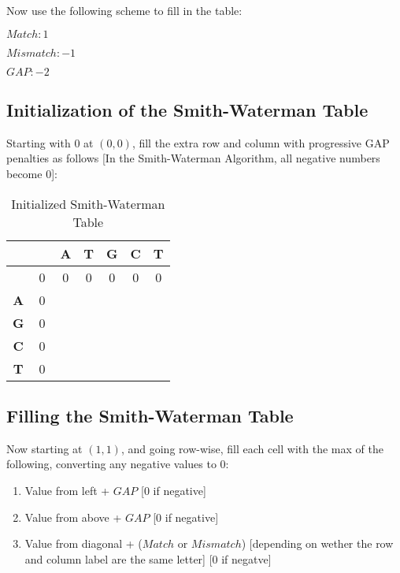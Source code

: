 Now use the following scheme to fill in the table:

$Match: 1$

$Mismatch: -1$

$GAP: -2$

\subsection{Initialization of the Smith-Waterman Table}

Starting with 0 at $(0,0)$, fill the extra row and column with progressive GAP penalties as follows [In the Smith-Waterman Algorithm, all negative numbers become 0]:

\begin{table}[htbp]
    \centering
    \begin{tabular}{|c|c|c|c|c|c|c|}
        \hline
          & $\phantom{\textbf{A}}$ & \textbf{A} & \textbf{T} & \textbf{G} & \textbf{C} & \textbf{T} \\
        \hline
        & 0 & 0 & 0 & 0 & 0 & 0 \\
        \hline
        \textbf{A} & 0 &  &  &  &  &  \\
        \hline
        \textbf{G} & 0 &  &  &  &  &  \\
        \hline
        \textbf{C} & 0 &  &  &  &  &  \\
        \hline
        \textbf{T} & 0 &  &  &  &  &  \\
        \hline
    \end{tabular}
    \caption{Initialized Smith-Waterman Table}
\end{table}

\subsection{Filling the Smith-Waterman Table}

Now starting at $(1,1)$, and going row-wise, fill each cell with the max of the following, converting any negative values to 0:

\begin{enumerate}
    \item Value from left + $GAP$ [0 if negative]
    
    \item Value from above + $GAP$ [0 if negative]
    
    \item Value from diagonal + ($Match$ or $Mismatch$) [depending on wether the row and column label are the same letter] [0 if negatve]

\end{enumerate}

